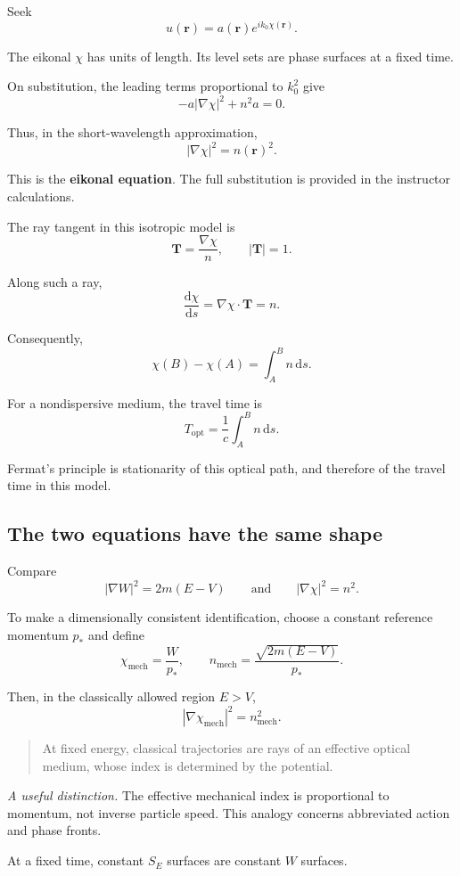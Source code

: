 \documentclass[11pt,a4paper]{article}
\newcommand{\dd}{\mathrm{d}}
\newcommand{\vr}{\mathbf{r}}
\newcommand{\vT}{\mathbf{T}}
\begin{document}
Seek
\[
u(\vr)=a(\vr)e^{ik_0\chi(\vr)}.
\]

The eikonal \(\chi\) has units of length.
Its level sets are phase surfaces at a fixed time.

On substitution, the leading terms proportional to
\(k_0^2\) give
\[
-a|\nabla\chi|^2+n^2a=0.
\]

Thus, in the short-wavelength approximation,
\[
\boxed{
|\nabla\chi|^2=n(\vr)^2.
}
\]

This is the \textbf{eikonal equation}.
The full substitution is provided in the instructor
calculations.

The ray tangent in this isotropic model is
\[
\boxed{
\vT=\frac{\nabla\chi}{n},
\qquad
|\vT|=1.
}
\]

Along such a ray,
\[
\frac{\dd\chi}{\dd s}
=
\nabla\chi\cdot\vT
=
n.
\]

Consequently,
\[
\boxed{
\chi(B)-\chi(A)
=
\int_A^B n\,\dd s.
}
\]

For a nondispersive medium, the travel time is
\[
T_{\mathrm{opt}}
=
\frac1c\int_A^B n\,\dd s.
\]

Fermat's principle is stationarity of this optical path,
and therefore of the travel time in this model.

\subsection*{The two equations have the same shape}

Compare
\[
\boxed{
|\nabla W|^2=2m(E-V)
\qquad\text{and}\qquad
|\nabla\chi|^2=n^2.
}
\]

To make a dimensionally consistent identification, choose
a constant reference momentum \(p_*\) and define
\[
\chi_{\mathrm{mech}}=\frac{W}{p_*},
\qquad
n_{\mathrm{mech}}
=
\frac{\sqrt{2m(E-V)}}{p_*}.
\]

Then, in the classically allowed region \(E>V\),
\[
\boxed{
|\nabla\chi_{\mathrm{mech}}|^2
=
n_{\mathrm{mech}}^2.
}
\]

\begin{quote}
At fixed energy, classical trajectories are rays of an
effective optical medium, whose index is determined by
the potential.
\end{quote}

\textit{A useful distinction.}
The effective mechanical index is proportional to momentum,
not inverse particle speed.
This analogy concerns abbreviated action and phase fronts.

At a fixed time, constant \(S_E\) surfaces are constant
\(W\) surfaces.
\end{document}
